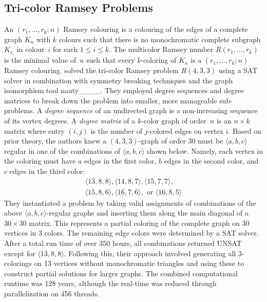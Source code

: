 \subsection{Tri-color Ramsey Problems}

An $(r_1,\dotsc,r_k; n)$ Ramsey colouring is a colouring of the edges of a complete graph $K_n$ with $k$ colours such that there is no monochromatic complete subgraph $K_{r_i}$ in colour~$i$ for each $1\leq i\leq k$.
The multicolor Ramsey number $R(r_1,\dotsc,r_k)$ is the minimal value of~$n$ such that every $k$-coloring of $K_n$ is a $(r_1,\dotsc,r_k; n)$ Ramsey colouring.
 solved the tri-color Ramsey problem $R(4, 3, 3)$ using a SAT solver in combination with symmetry breaking techniques and the graph isomorphism tool nauty____. 
They employed degree sequences and degree matrices to break down the problem into smaller, more manageable sub-problems. 
A \emph{degree sequence} of an undirected graph is a non-increasing sequence of its vertex degrees. 
A \emph{degree matrix} of a $k$-color graph of order~$n$ is an $n \times k$ matrix where entry $(i,j)$ is the number of $j$-colored edges on vertex $i$.
Based on prior theory, the authors knew a $(4,3,3)$-graph of order 30 must be $\langle a,b,c\rangle$ regular in one of the combinations of $\langle a,b,c\rangle$ shown below. Namely, each vertex in the coloring must have $a$ edges in the first color, $b$ edges in the second color, and $c$
edges in the third color:
\begin{gather*}
\langle 13, 8, 8\rangle,
\langle14, 8, 7\rangle,
\langle15, 7, 7\rangle, \\
\langle15, 8, 6\rangle,
\langle16, 7, 6\rangle,
\text{ or } \langle16, 8, 5\rangle
\end{gather*}
They instantiated a problem by taking valid assignments of combinations of the above $\langle a,b,c\rangle$-regular graphs and inserting them along the main diagonal of a $30 \times 30$ matrix. 
This represents a partial coloring of the complete graph on 30 vertices in 3 colors. 
The remaining edge colors were determined by a SAT solver. After a total run time of over 350 hours, all combinations returned UNSAT except for $\langle13,8,8\rangle$.
Following this, their approach involved generating all 3-colorings on 13 vertices without monochromatic triangles and using these to construct partial solutions for larger graphs. The combined computational runtime was 128 years, although the real-time was reduced through parallelization on 456 threads.

